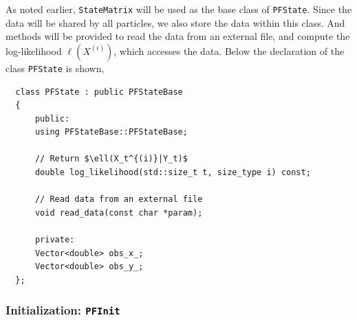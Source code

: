 As noted earlier, \verb|StateMatrix| will be used as the base class of
\verb|PFState|. Since the data will be shared by all particles, we also store
the data within this class. And methods will be provided to read the data from
an external file, and compute the log-likelihood $\ell(X^{(i)})$, which
accesses the data. Below the declaration of the class \verb|PFState| is shown,
\begin{Verbatim}
  class PFState : public PFStateBase
  {
      public:
      using PFStateBase::PFStateBase;

      // Return $\ell(X_t^{(i)}|Y_t)$
      double log_likelihood(std::size_t t, size_type i) const;

      // Read data from an external file
      void read_data(const char *param);

      private:
      Vector<double> obs_x_;
      Vector<double> obs_y_;
  };
\end{Verbatim}

\subsubsection{Initialization: \texttt{PFInit}}

